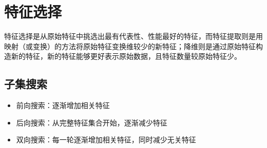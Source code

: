 
\section{特征选择}
特征选择是从原始特征中挑选出最有代表性、性能最好的特征，而特征提取则是用映射（或变换）的方法将原始特征变换维较少的新特征；降维则是通过原始特征构造新的特征，新的特征能够更好表示原始数据，且特征数量较原始特征少。

\subsection{子集搜索}
\begin{itemize}
	\item 前向搜索：逐渐增加相关特征
	\item 后向搜索：从完整特征集合开始，逐渐减少特征
	\item 双向搜索：每一轮逐渐增加相关特征，同时减少无关特征
\end{itemize}

